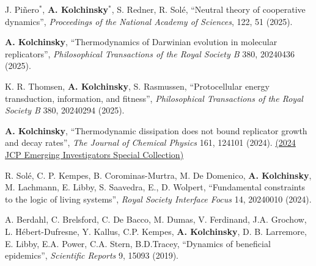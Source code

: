 J. Piñero$^*$, \textbf{A. Kolchinsky}$^*$, S. Redner, R. Solé, ``Neutral theory of cooperative dynamics'', \emph{Proceedings of the National Academy of Sciences}, 122, 51 (2025).   %

\textbf{A. Kolchinsky}, ``Thermodynamics of Darwinian evolution in molecular replicators'', \emph{Philosophical Transactions of the Royal Society B} 380, 20240436 (2025).  

K. R. Thomsen, \textbf{A. Kolchinsky}, S. Rasmussen, ``Protocellular energy transduction, information, and fitness'', \emph{Philosophical Transactions of the Royal Society B} 380, 20240294 (2025).  

\textbf{A. Kolchinsky}, ``Thermodynamic dissipation does not bound replicator growth and decay rates'', \emph{The Journal of Chemical Physics} 161, 124101 (2024).   \href{https://pubs.aip.org/collection/330788/2024-JCP-Emerging-Investigators-Special-Collection}{(2024 JCP Emerging Investigators Special Collection)} %

R. Solé, C. P. Kempes, B. Corominas-Murtra, M. De Domenico, \textbf{A. Kolchinsky}, M. Lachmann, E. Libby, S. Saavedra, E., D. Wolpert, ``Fundamental constraints to the logic of living systems'', \emph{Royal Society Interface Focus} 14, 20240010 (2024).   %

A. Berdahl, C. Brelsford, C. De Bacco, M. Dumas, V. Ferdinand, J.A. Grochow, L. Hébert-Dufresne, Y. Kallus, C.P. Kempes, \textbf{A. Kolchinsky}, D. B. Larremore, E. Libby, E.A. Power, C.A. Stern, B.D.Tracey, ``Dynamics of beneficial epidemics'', \emph{Scientific Reports} 9, 15093 (2019).  

